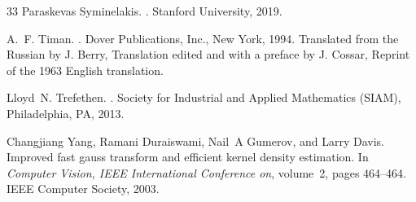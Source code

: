 \documentclass[10pt,a4paper]{article}
\theoremstyle{plain}\newtheorem{theorem}{Theorem}
\theoremstyle{definition}
\begin{document}
\begin{thebibliography}{33}
Paraskevas Syminelakis.
.
\newblock Stanford University, 2019.

A.~F. Timan.
.
\newblock Dover Publications, Inc., New York, 1994.
\newblock Translated from the Russian by J. Berry, Translation edited and with
  a preface by J. Cossar, Reprint of the 1963 English translation.

Lloyd~N. Trefethen.
.
\newblock Society for Industrial and Applied Mathematics (SIAM), Philadelphia,
  PA, 2013.

Changjiang Yang, Ramani Duraiswami, Nail~A Gumerov, and Larry Davis.
\newblock Improved fast gauss transform and efficient kernel density
  estimation.
\newblock In {\em Computer Vision, IEEE International Conference on}, volume~2,
  pages 464--464. IEEE Computer Society, 2003.
\end{thebibliography}
\end{document}
